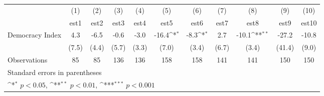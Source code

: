 {
\def\sym#1{\ifmmode^{#1}\else\(^{#1}\)\fi}
\begin{tabular}{l*{10}{c}}
\hline\hline
                    &\multicolumn{1}{c}{(1)}         &\multicolumn{1}{c}{(2)}         &\multicolumn{1}{c}{(3)}         &\multicolumn{1}{c}{(4)}         &\multicolumn{1}{c}{(5)}         &\multicolumn{1}{c}{(6)}         &\multicolumn{1}{c}{(7)}         &\multicolumn{1}{c}{(8)}         &\multicolumn{1}{c}{(9)}         &\multicolumn{1}{c}{(10)}         \\
                    &        est1         &        est2         &        est3         &        est4         &        est5         &        est6         &        est7         &        est8         &        est9         &       est10         \\
\hline
Democracy Index     &         4.3         &        -6.5         &        -0.6         &        -3.0         &       -16.4\sym{*}  &        -8.3\sym{*}  &         2.7         &       -10.1\sym{**} &       -27.2         &       -10.8         \\
                    &       (7.5)         &       (4.4)         &       (5.7)         &       (3.3)         &       (7.0)         &       (3.4)         &       (6.7)         &       (3.4)         &      (41.4)         &       (9.0)         \\
\hline
Observations        &          85         &          85         &         136         &         136         &         158         &         158         &         141         &         141         &         150         &         150         \\
\hline\hline
\multicolumn{11}{l}{\footnotesize Standard errors in parentheses}\\
\multicolumn{11}{l}{\footnotesize \sym{*} \(p<0.05\), \sym{**} \(p<0.01\), \sym{***} \(p<0.001\)}\\
\end{tabular}
}

